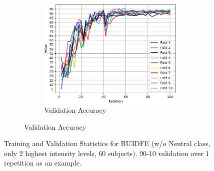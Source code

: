 \begin{figure}[ht]
\begin{subfigure}{\textwidth}
        \begin{subfigure}{0.32\textwidth}
            \includegraphics[width=\linewidth]{Images/training/BU3DFE_6_val_acc.png}
            \caption{Validation Accuracy}
            \label{BU3DFE_6_val_acc}
        \end{subfigure}
    \end{subfigure}
    \caption{Training and Validation Statistics for BU3DFE (w/o Neutral class, 
    only 2 highest intensity levels, 60 subjects). 90-10 validation over 1 repetition as an example.}
    \label{training_stats1}
\end{figure}
